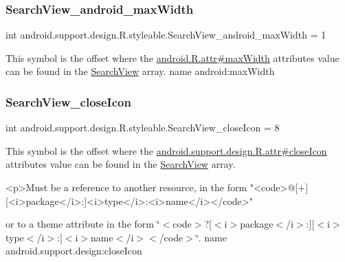 \subsubsection{\texorpdfstring{Search\+View\+\_\+android\+\_\+max\+Width}{SearchView\_android\_maxWidth}}
{\footnotesize\ttfamily int android.\+support.\+design.\+R.\+styleable.\+Search\+View\+\_\+android\+\_\+max\+Width = 1\hspace{0.3cm}{\ttfamily [static]}}

This symbol is the offset where the \hyperlink{}{android.\+R.\+attr\#max\+Width} attribute\textquotesingle{}s value can be found in the \hyperlink{classandroid_1_1support_1_1design_1_1R_1_1styleable_a8f7e72dc1bf854e14c1be7dbc1cb7392}{Search\+View} array.  name android\+:max\+Width \mbox{\label{classandroid_1_1support_1_1design_1_1R_1_1styleable_aa0a9fd15edd08df1deca5a77072d1fb5}} 
\subsubsection{\texorpdfstring{Search\+View\+\_\+close\+Icon}{SearchView\_closeIcon}}
{\footnotesize\ttfamily int android.\+support.\+design.\+R.\+styleable.\+Search\+View\+\_\+close\+Icon = 8\hspace{0.3cm}{\ttfamily [static]}}

This symbol is the offset where the \hyperlink{classandroid_1_1support_1_1design_1_1R_1_1attr_a5e570f928d1b026dd3dca79dcefa05cc}{android.\+support.\+design.\+R.\+attr\#close\+Icon} attribute\textquotesingle{}s value can be found in the \hyperlink{classandroid_1_1support_1_1design_1_1R_1_1styleable_a8f7e72dc1bf854e14c1be7dbc1cb7392}{Search\+View} array.

\begin{DoxyVerb}      <p>Must be a reference to another resource, in the form "<code>@[+][<i>package</i>:]<i>type</i>:<i>name</i></code>"
\end{DoxyVerb}
 or to a theme attribute in the form \char`\"{}$<$code$>$?\mbox{[}$<$i$>$package$<$/i$>$\+:\mbox{]}\mbox{[}$<$i$>$type$<$/i$>$\+:\mbox{]}$<$i$>$name$<$/i$>$$<$/code$>$\char`\"{}.  name android.\+support.\+design\+:close\+Icon \mbox{\label{classandroid_1_1support_1_1design_1_1R_1_1styleable_a9fa9a7e88b9b47cd40415ede8e02019d}} 
